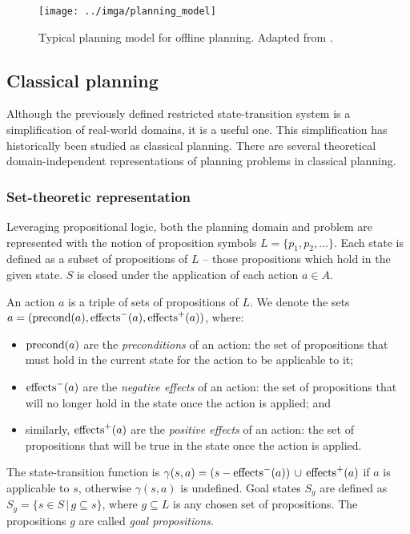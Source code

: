 \begin{figure}[htb]
\begin{center}
\texttt{[image: ../imga/planning\_model]}
\end{center}
\caption{Typical planning model for offline planning. Adapted from \citep[Figure~1.3]{Ghallab2004}.}
\label{fig:planning-model}
\end{figure}

\subsection{Classical planning}\label{classical-planning}

Although the previously defined restricted state-transition system is a simplification of real-world
domains, it is a useful one. 
This simplification has historically been studied as classical planning.
There are several theoretical domain-independent representations
of planning problems in classical planning. \citep[Chapter~2]{Ghallab2004}

\subsubsection{Set-theoretic representation}

Leveraging propositional logic, both the planning domain and problem
are represented with the notion
of proposition symbols $L = \{p_1, p_2, \ldots\}$.
Each state is defined as a subset of propositions of $L$ -- those propositions
which hold in the given state. $S$ is closed under the application of each
action $a \in A$.

An action $a$
is a triple of sets of propositions of $L$.
We denote the sets $a = (\operatorname{\textrm{precond}}(a), \operatorname{\textrm{effects}}^-(a), \operatorname{\textrm{effects}}^+(a))$, where:
\begin{itemize}
\item $\operatorname{\textrm{precond}}(a)$ are the \textit{preconditions} of an action: the set of
propositions that must hold in the current state for the action to be applicable to it;
\item $\operatorname{\textrm{effects}}^-(a)$ are the \textit{negative effects} of an action:
the set of propositions
that will no longer hold in the state once the action is applied; and
\item similarly, $\operatorname{\textrm{effects}}^+(a)$ are the \textit{positive effects} of an action:
the set of propositions that will be true in the state once the action is applied.
\end{itemize}

The state-transition function is $\gamma(s, a) = (s - \operatorname{\textrm{effects}}^-(a)) \,\cup\,
\operatorname{\textrm{effects}}^+(a)$ if $a$ is applicable to $s$,
otherwise $\gamma(s, a)$ is undefined. Goal states $S_g$ are defined as
$S_g = \{s \in S \,|\, g \subseteq s\}$, where
$g \subseteq L$ is any chosen set of propositions. The propositions $g$ are called
\textit{goal propositions}.

